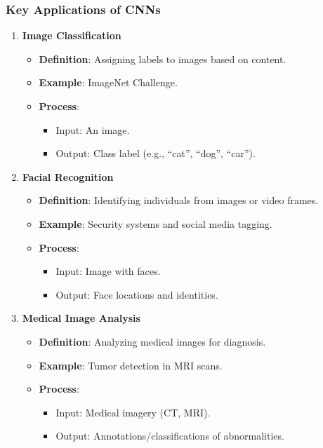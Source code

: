 \documentclass[aspectratio=169]{beamer}
\begin{document}
\begin{frame}[fragile]
    \frametitle{Key Applications of CNNs}
    \begin{enumerate}
        \item \textbf{Image Classification}
        \begin{itemize}
            \item \textbf{Definition}: Assigning labels to images based on content.
            \item \textbf{Example}: ImageNet Challenge.
            \item \textbf{Process}:
            \begin{itemize}
                \item Input: An image.
                \item Output: Class label (e.g., “cat”, “dog”, “car”).
            \end{itemize}
        \end{itemize}
        
        \item \textbf{Facial Recognition}
        \begin{itemize}
            \item \textbf{Definition}: Identifying individuals from images or video frames.
            \item \textbf{Example}: Security systems and social media tagging.
            \item \textbf{Process}:
            \begin{itemize}
                \item Input: Image with faces.
                \item Output: Face locations and identities.
            \end{itemize}
        \end{itemize}

        \item \textbf{Medical Image Analysis}
        \begin{itemize}
            \item \textbf{Definition}: Analyzing medical images for diagnosis.
            \item \textbf{Example}: Tumor detection in MRI scans.
            \item \textbf{Process}:
            \begin{itemize}
                \item Input: Medical imagery (CT, MRI).
                \item Output: Annotations/classifications of abnormalities.
            \end{itemize}
        \end{itemize}
    \end{enumerate}
\end{frame}
\end{document}
